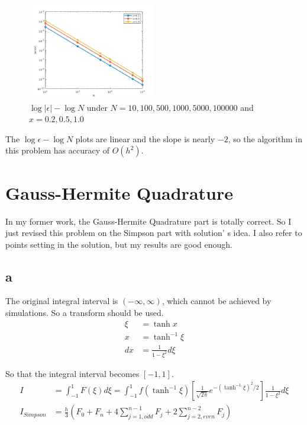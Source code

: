 \documentclass[letterpaper,10pt]{article}
\begin{document}
\begin{figure}[h]
  \centering
  \includegraphics[width=0.5\textwidth]{p3_2.png}
  \caption{$\log |\epsilon|-\log N$ under $N=10,100,500,1000,5000,100000$ and $x=0.2,0.5,1.0$}
  \label{fig3_2}
\end{figure}

The $\log \epsilon-\log N$ plots are linear and the slope is nearly $-2$, so the algorithm in this problem has 
accuracy of $O\left(h^2\right)$. 
\section{Gauss-Hermite Quadrature}
In my former work, the Gauss-Hermite Quadrature part is totally correct. So I just revised this problem 
on the Simpson part with solution' s idea. I also refer to points setting in the solution, but my results 
are good enough. 
\subsection{a}
The original integral interval is $\left(-\infty,\infty\right)$, which cannot be achieved by simulations. 
So a transform should be used. 
\begin{align*}
  \xi&=\tanh x\\
  x&=\tanh ^{-1} \xi\\
  dx&=\frac{1}{1-\xi ^2}d\xi
\end{align*}

So that the integral interval becomes $\left[-1,1\right]$. 
\begin{align*}
  I&=\int^1_{-1}F\left(\xi\right)d\xi=\int^1_{-1}f\left(\tanh^{-1}\xi\right)\left[\frac{1}{\sqrt{2\pi}}e^{-\left(\tanh^{-1}\xi\right)^2/2}\right]\frac{1}{1-\xi ^2}d\xi\\
  I_{Simpson}&=\frac{h}{3}\left(F_0+F_{n}+4\sum^{n-1}_{j=1,odd}F_j+2\sum^{n-2}_{j=2,even}F_j\right)
\end{align*}
\end{document}
